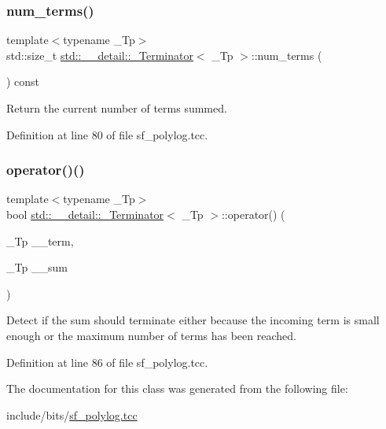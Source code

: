 \subsubsection{\texorpdfstring{num\+\_\+terms()}{num\_terms()}}
{\footnotesize\ttfamily template$<$typename \+\_\+\+Tp$>$ \\
std\+::size\+\_\+t \hyperlink{classstd_1_1____detail_1_1__Terminator}{std\+::\+\_\+\+\_\+detail\+::\+\_\+\+Terminator}$<$ \+\_\+\+Tp $>$\+::num\+\_\+terms (\begin{DoxyParamCaption}{ }\end{DoxyParamCaption}) const\hspace{0.3cm}{\ttfamily [inline]}}



Return the current number of terms summed. 



Definition at line 80 of file sf\+\_\+polylog.\+tcc.

\mbox{\label{classstd_1_1____detail_1_1__Terminator_a6c69c623075f36692ae86dd65b9c4a5c}} 
\subsubsection{\texorpdfstring{operator()()}{operator()()}}
{\footnotesize\ttfamily template$<$typename \+\_\+\+Tp$>$ \\
bool \hyperlink{classstd_1_1____detail_1_1__Terminator}{std\+::\+\_\+\+\_\+detail\+::\+\_\+\+Terminator}$<$ \+\_\+\+Tp $>$\+::operator() (\begin{DoxyParamCaption}\item[{\+\_\+\+Tp}]{\+\_\+\+\_\+term,  }\item[{\+\_\+\+Tp}]{\+\_\+\+\_\+sum }\end{DoxyParamCaption})\hspace{0.3cm}{\ttfamily [inline]}}



Detect if the sum should terminate either because the incoming term is small enough or the maximum number of terms has been reached. 



Definition at line 86 of file sf\+\_\+polylog.\+tcc.



The documentation for this class was generated from the following file\+:\begin{DoxyCompactItemize}
\item 
include/bits/\hyperlink{sf__polylog_8tcc}{sf\+\_\+polylog.\+tcc}\end{DoxyCompactItemize}
